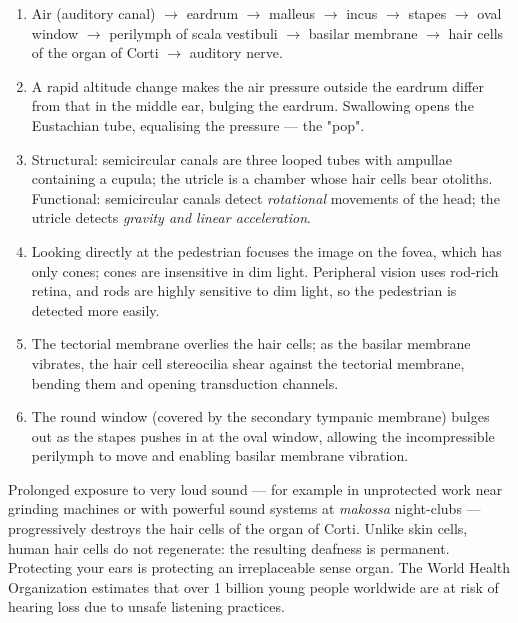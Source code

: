 \documentclass[11pt]{article}
\newcommand{\cle}[1]{{\popxbold\color{popdark}#1}}
\begin{document}
\begin{corrige}[Exercise 1]
\begin{enumerate}
\item Air (auditory canal) $\rightarrow$ eardrum $\rightarrow$ malleus $\rightarrow$ incus $\rightarrow$ stapes $\rightarrow$ oval window $\rightarrow$ perilymph of scala vestibuli $\rightarrow$ basilar membrane $\rightarrow$ hair cells of the organ of Corti $\rightarrow$ auditory nerve.
\item A rapid altitude change makes the air pressure outside the eardrum differ from that in the middle ear, bulging the eardrum. Swallowing opens the \cle{Eustachian tube}, equalising the pressure — the "pop".
\item Structural: semicircular canals are three looped tubes with ampullae containing a cupula; the utricle is a chamber whose hair cells bear otoliths. Functional: semicircular canals detect \emph{rotational} movements of the head; the utricle detects \emph{gravity and linear acceleration}.
\item Looking directly at the pedestrian focuses the image on the fovea, which has only cones; cones are insensitive in dim light. Peripheral vision uses rod-rich retina, and rods are highly sensitive to dim light, so the pedestrian is detected more easily.
\item The tectorial membrane overlies the hair cells; as the basilar membrane vibrates, the hair cell stereocilia shear against the tectorial membrane, bending them and opening transduction channels.
\item The round window (covered by the secondary tympanic membrane) bulges out as the stapes pushes in at the oval window, allowing the incompressible perilymph to move and enabling basilar membrane vibration.
\end{enumerate}
\end{corrige}

\begin{savaistu}
Prolonged exposure to very loud sound — for example in unprotected work near grinding machines or with powerful sound systems at \emph{makossa} night-clubs — progressively destroys the hair cells of the organ of Corti. Unlike skin cells, human hair cells do not regenerate: the resulting deafness is permanent. Protecting your ears is protecting an irreplaceable sense organ. The World Health Organization estimates that over 1 billion young people worldwide are at risk of hearing loss due to unsafe listening practices.
\end{savaistu}
\end{document}
